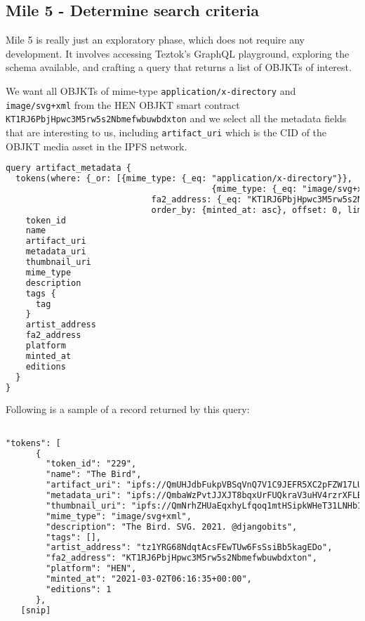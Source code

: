 \subsection {Mile 5 - Determine search criteria}

Mile 5 is really just an exploratory phase, which does not require any development. It involves accessing Teztok's GraphQL playground\footnotemark[7], exploring the schema available, and crafting a query that returns a list of OBJKTs of interest.


We want all OBJKTs of mime-type \texttt{application/x-directory} and \\ \texttt{image/svg+xml} from the HEN OBJKT smart contract \\\texttt{KT1RJ6PbjHpwc3M5rw5s2Nbmefwbuwbdxton} and we select all the metadata fields that are interesting to us, including \texttt{artifact\_uri} which is the CID of the OBJKT media asset in the IPFS network.


\vspace{0.5cm}

\begin{lstlisting}[language=HTML, caption={GraphQL query to retrieve OBJKTs of interest}] 
query artifact_metadata {
  tokens(where: {_or: [{mime_type: {_eq: "application/x-directory"}},
    									 {mime_type: {_eq: "image/svg+xml"}}],
    						 fa2_address: {_eq: "KT1RJ6PbjHpwc3M5rw5s2Nbmefwbuwbdxton"}},
    						 order_by: {minted_at: asc}, offset: 0, limit: 10) {
    token_id
    name
    artifact_uri
    metadata_uri
    thumbnail_uri
    mime_type
    description
    tags {
      tag
    }
    artist_address
    fa2_address
    platform
    minted_at
    editions
  }
}
\end{lstlisting}


Following is a sample of a record returned by this query:


\vspace{0.5cm}

\begin{lstlisting}[language=HTML, caption={Sample OBJKT Record }] 

"tokens": [
      {
        "token_id": "229",
        "name": "The Bird",
        "artifact_uri": "ipfs://QmUHJdbFukpVBSqVnQ7V1C9JEFR5XC2pFZW17LUEpAtQnd",
        "metadata_uri": "ipfs://QmbaWzPvtJJXJT8bqxUrFUQkraV3uHV4rzrXFLBcJ18kH1",
        "thumbnail_uri": "ipfs://QmNrhZHUaEqxhyLfqoq1mtHSipkWHeT31LNHb1QEbDHgnc",
        "mime_type": "image/svg+xml",
        "description": "The Bird. SVG. 2021. @djangobits",
        "tags": [],
        "artist_address": "tz1YRG68NdqtAcsFEwTUw6FsSsiBb5kagEDo",
        "fa2_address": "KT1RJ6PbjHpwc3M5rw5s2Nbmefwbuwbdxton",
        "platform": "HEN",
        "minted_at": "2021-03-02T06:16:35+00:00",
        "editions": 1
      },
   [snip]
\end{lstlisting}




